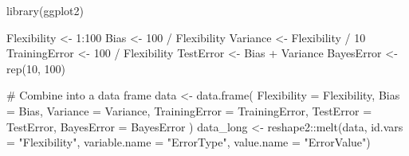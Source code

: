 \documentclass[
]{article}
\newenvironment{Shaded}{\begin{snugshade}}{\end{snugshade}}
\newcommand{\AttributeTok}[1]{\textcolor[rgb]{0.40,0.45,0.13}{#1}}
\newcommand{\CommentTok}[1]{\textcolor[rgb]{0.37,0.37,0.37}{#1}}
\newcommand{\DecValTok}[1]{\textcolor[rgb]{0.68,0.00,0.00}{#1}}
\newcommand{\FunctionTok}[1]{\textcolor[rgb]{0.28,0.35,0.67}{#1}}
\newcommand{\NormalTok}[1]{\textcolor[rgb]{0.00,0.23,0.31}{#1}}
\newcommand{\OtherTok}[1]{\textcolor[rgb]{0.00,0.23,0.31}{#1}}
\newcommand{\SpecialCharTok}[1]{\textcolor[rgb]{0.37,0.37,0.37}{#1}}
\newcommand{\StringTok}[1]{\textcolor[rgb]{0.13,0.47,0.30}{#1}}
\begin{document}
\begin{Shaded}
\begin{Highlighting}[]
\FunctionTok{library}\NormalTok{(ggplot2)}

\NormalTok{Flexibility }\OtherTok{\textless{}{-}} \DecValTok{1}\SpecialCharTok{:}\DecValTok{100}
\NormalTok{Bias }\OtherTok{\textless{}{-}} \DecValTok{100} \SpecialCharTok{/}\NormalTok{ Flexibility }
\NormalTok{Variance }\OtherTok{\textless{}{-}}\NormalTok{ Flexibility }\SpecialCharTok{/} \DecValTok{10} 
\NormalTok{TrainingError }\OtherTok{\textless{}{-}} \DecValTok{100} \SpecialCharTok{/}\NormalTok{ Flexibility}
\NormalTok{TestError }\OtherTok{\textless{}{-}}\NormalTok{ Bias }\SpecialCharTok{+}\NormalTok{ Variance }
\NormalTok{BayesError }\OtherTok{\textless{}{-}} \FunctionTok{rep}\NormalTok{(}\DecValTok{10}\NormalTok{, }\DecValTok{100}\NormalTok{)  }

\CommentTok{\# Combine into a data frame}
\NormalTok{data }\OtherTok{\textless{}{-}} \FunctionTok{data.frame}\NormalTok{(}
  \AttributeTok{Flexibility =}\NormalTok{ Flexibility,}
  \AttributeTok{Bias =}\NormalTok{ Bias,}
  \AttributeTok{Variance =}\NormalTok{ Variance,}
  \AttributeTok{TrainingError =}\NormalTok{ TrainingError,}
  \AttributeTok{TestError =}\NormalTok{ TestError,}
  \AttributeTok{BayesError =}\NormalTok{ BayesError}
\NormalTok{)}
\NormalTok{data\_long }\OtherTok{\textless{}{-}}\NormalTok{ reshape2}\SpecialCharTok{::}\FunctionTok{melt}\NormalTok{(data, }\AttributeTok{id.vars =} \StringTok{"Flexibility"}\NormalTok{, }\AttributeTok{variable.name =} \StringTok{"ErrorType"}\NormalTok{, }\AttributeTok{value.name =} \StringTok{"ErrorValue"}\NormalTok{)}


\end{Highlighting}
\end{Shaded}
\end{document}

